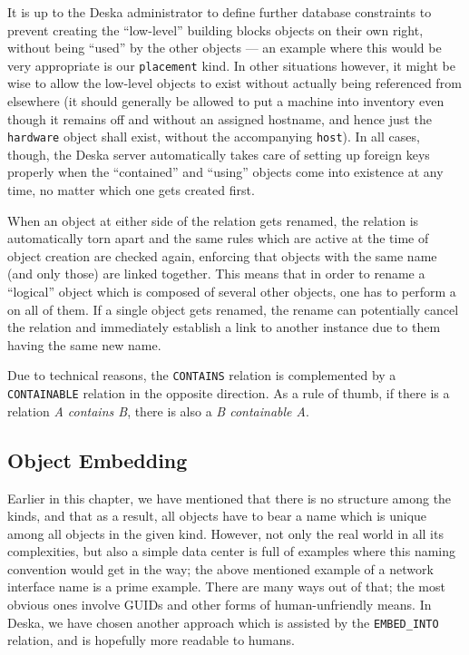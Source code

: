\documentclass[deska]{subfiles}
\begin{document}
It is up to the Deska administrator to define further database constraints to prevent creating the ``low-level''
building blocks objects on their own right, without being ``used'' by the other objects --- an example where this would
be very appropriate is our {\tt placement} kind.  In other situations however, it might be wise to allow the low-level
objects to exist without actually being referenced from elsewhere (it should generally be allowed to put a machine into
inventory even though it remains off and without an assigned hostname, and hence just the {\tt hardware} object shall
exist, without the accompanying {\tt host}).  In all cases, though, the Deska server automatically takes care of setting
up foreign keys properly when the ``contained'' and ``using'' objects come into existence at any time, no matter which
one gets created first.

When an object at either side of the relation gets renamed, the relation is automatically torn apart and the same rules
which are active at the time of object creation are checked again, enforcing that objects with the same name (and only
those) are linked together.  This means that in order to rename a ``logical'' object which is composed of several other
objects, one has to perform a  on all of them.  If a single object gets renamed, the rename
can potentially cancel the relation and immediately establish a link to another instance due to them having the same new
name.

Due to technical reasons, the {\tt CONTAINS} relation is complemented by a {\tt CONTAINABLE} relation in the opposite
direction.  As a rule of thumb, if there is a relation {\em A contains B}, there is also a {\em B containable A}.

\subsection{Object Embedding}

Earlier in this chapter, we have mentioned that there is no structure among the kinds, and that as a result, all objects
have to bear a name which is unique among all objects in the given kind.  However, not only the real world in all its
complexities, but also a simple data center is full of examples where this naming convention would get in the way; the
above mentioned example of a network interface name is a prime example.  There are many ways out of that; the most
obvious ones involve GUIDs and other forms of human-unfriendly means.  In Deska, we have chosen another approach which
is assisted by the {\tt EMBED\_INTO} relation, and is hopefully more readable to humans.
\end{document}
